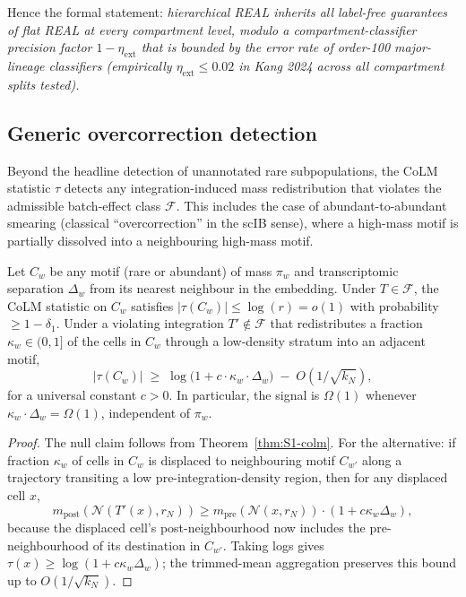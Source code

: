 Hence the formal statement: \emph{hierarchical REAL inherits all label-free guarantees of flat REAL at every compartment level, modulo a compartment-classifier precision factor $1-\eta_{\text{ext}}$ that is bounded by the error rate of order-100 major-lineage classifiers (empirically $\eta_{\text{ext}} \leq 0.02$ in Kang 2024 across all compartment splits tested).}

\subsection{Generic overcorrection detection}
\label{sec:S1-overcorrection}

Beyond the headline detection of unannotated rare subpopulations, the CoLM statistic $\tau$ detects any integration-induced mass redistribution that violates the admissible batch-effect class $\mathcal{F}$. This includes the case of abundant-to-abundant smearing (classical ``overcorrection'' in the scIB sense), where a high-mass motif is partially dissolved into a neighbouring high-mass motif.

\begin{theorem}
\label{thm:S1-overcorrection}
Let $C_{w}$ be any motif (rare or abundant) of mass $\pi_{w}$ and transcriptomic separation $\Delta_{w}$ from its nearest neighbour in the embedding. Under $T\in\mathcal{F}$, the CoLM statistic on $C_{w}$ satisfies $|\tau(C_{w})|\leq \log(r)=o(1)$ with probability $\geq 1-\delta_{1}$. Under a violating integration $T'\notin\mathcal{F}$ that redistributes a fraction $\kappa_{w}\in(0,1]$ of the cells in $C_{w}$ through a low-density stratum into an adjacent motif,
\[
  |\tau(C_{w})| \;\geq\; \log\!\bigl(1 + c\cdot\kappa_{w}\cdot \Delta_{w}\bigr) \;-\; O(1/\sqrt{k_{N}}),
\]
for a universal constant $c>0$. In particular, the signal is $\Omega(1)$ whenever $\kappa_{w}\cdot\Delta_{w}=\Omega(1)$, independent of $\pi_{w}$.
\end{theorem}

\begin{proof}
The null claim follows from Theorem~\ref{thm:S1-colm}. For the alternative: if fraction $\kappa_{w}$ of cells in $C_{w}$ is displaced to neighbouring motif $C_{w'}$ along a trajectory transiting a low pre-integration-density region, then for any displaced cell $x$,
\[
  m_{\mathrm{post}}(\mathcal{N}(T'(x), r_{N})) \geq m_{\mathrm{pre}}(\mathcal{N}(x, r_{N})) \cdot (1 + c\kappa_{w}\Delta_{w}),
\]
because the displaced cell's post-neighbourhood now includes the pre-neighbourhood of its destination in $C_{w'}$. Taking logs gives $\tau(x)\geq \log(1+c\kappa_{w}\Delta_{w})$; the trimmed-mean aggregation preserves this bound up to $O(1/\sqrt{k_{N}})$.
\end{proof}

